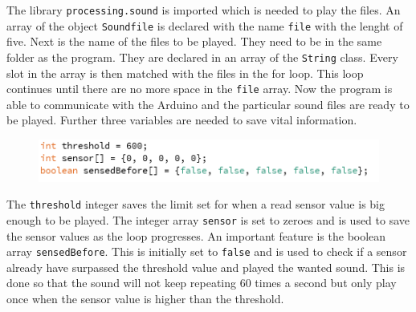  The library \texttt{processing.sound} is imported which is needed to play the files. An array of the object \texttt{Soundfile} is declared with the name \texttt{file} with the lenght of five. Next is the name of the files to be played. They need to be in the same folder as the program. They are declared in an array of the \texttt{String} class. Every slot in the array is then matched with the files in the for loop. This loop continues until there are no more space in the \texttt{file} array.
Now the program is able to communicate with the Arduino and the particular sound files are ready to be played. Further three variables are needed to save  vital information.
% 

\begin{figure}[H]
\includegraphics[scale=0.8]{Figure/programkode03.png}
\end{figure}  

The  \texttt{threshold} integer saves the limit set for when a read sensor value is big enough to be played. The integer array \texttt{sensor} is set to zeroes and is used to save the sensor values as the loop progresses. An important feature is the boolean array \texttt{sensedBefore}. This is initially set to \texttt{false} and is used to check if a sensor already have surpassed the threshold value and  played the wanted sound. This is done so that the sound will not keep repeating 60 times a second but only play once when the sensor value is higher than the threshold.
 
